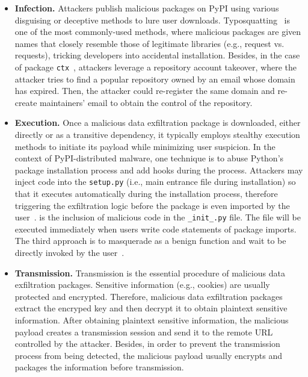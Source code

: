 \begin{itemize}
    \item \textbf{Infection.} Attackers publish malicious packages on PyPI using various disguising or deceptive methods to lure user downloads.  Typosquatting~\cite{9229803} is one of the most commonly-used methods, where malicious packages are given names that closely resemble those of legitimate libraries (e.g., request vs. requests), tricking developers into accidental installation.  Besides, in the case of package \texttt{ctx}~\cite{CTX2022}, attackers leverage a repository account takeover, where the attacker tries to find a popular repository owned by an email whose domain has expired. Then, the attacker could re-register the same domain and re-create maintainers' email to obtain the control of the repository. 
        
    \item \textbf{Execution.} Once a malicious data exfiltration package is downloaded, either directly or as a transitive dependency, it typically employs stealthy execution methods to initiate its payload while minimizing user suspicion. In the context of PyPI-distributed malware, one technique is to abuse Python's package installation process and add hooks during the process. Attackers may inject code into the \texttt{setup.py} (i.e., main entrance file during installation) so that it executes automatically during the installation process, therefore triggering the exfiltration logic before the package is even imported by the user~\cite{guo2023empirical}.  is the inclusion of malicious code in the \texttt{\_init\_.py} file. The file will be executed immediately when users write code statements of package imports. The third approach is to masquerade as a benign function and wait to be directly invoked by the user~\cite{zhang2025killing}.

    \item \textbf{Transmission.} Transmission is the essential procedure of malicious data exfiltration packages. Sensitive information (e.g., cookies) are usually protected and encrypted. Therefore, malicious data exfiltration packages  extract the encryped key and then decrypt it to obtain plaintext sensitive information. After obtaining plaintext sensitive information, the malicious payload creates a transmission session and send it to the remote URL controlled by the attacker. Besides, in order to prevent the transmission process from being detected, the malicious payload usually encrypts and packages the information before transmission.


\end{itemize}
